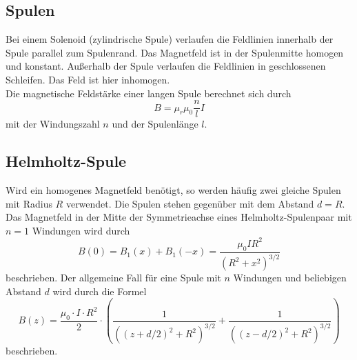 \subsection{Spulen}
Bei einem Solenoid (zylindrische Spule) verlaufen die Feldlinien innerhalb der Spule parallel zum Spulenrand. Das Magnetfeld ist in der Spulenmitte homogen und konstant.
Außerhalb der Spule verlaufen die Feldlinien in geschlossenen Schleifen. Das Feld ist hier inhomogen.\\
Die magnetische Feldstärke einer langen Spule berechnet sich durch
\begin{equation}
    B = \mu_r \mu_0 \frac{n}{l} I
\end{equation}
mit der Windungszahl $n$ und der Spulenlänge $l$.\\

\subsection{Helmholtz-Spule}
Wird ein homogenes Magnetfeld benötigt, so werden häufig zwei gleiche Spulen mit Radius $R$ verwendet.
Die Spulen stehen gegenüber mit dem Abstand $d=R$. Das Magnetfeld in der Mitte der Symmetrieachse eines Helmholtz-Spulenpaar mit $n=1$ Windungen wird durch
\begin{equation}
    B(0) = B_1(x) + B_1(-x) = \frac{\mu_0 I R^2}{(R^2+x^2)^{3/2}}
\end{equation}
beschrieben. Der allgemeine Fall für eine Spule mit $n$ Windungen und beliebigen Abstand $d$ wird durch die Formel \cite[87--88]{demtroeder}
\begin{equation}
    B(z) = \frac{\mu_0 \cdot I \cdot R^2}{2} \cdot \left ( \frac{1}{\left((z+d/2)^2+R^2\right)^{3/2}} + \frac{1}{\left((z-d/2)^2+R^2\right)^{3/2}} \right )
    \label{eqn:helm}
\end{equation}
beschrieben.